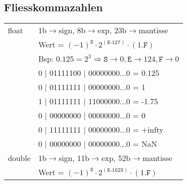 \subsection{Fliesskommazahlen}
\begin{center}
	\begin{tabular}{ ll } 
		float&1b$\rightarrow$sign, 8b$\rightarrow$exp, 23b$\rightarrow$mantisse\\
		&Wert = $(-1)^{\texttt{S}} \cdot 2^{(\texttt{E-127})} \cdot (1.\texttt{F})$\\
		&Bsp: $0.125 = 2^{3} \Rightarrow \texttt{S} \rightarrow 0, \texttt{E} \rightarrow 124, \texttt{F} \rightarrow 0$\\
		\hline
		 & 0 | 01111100 | 00000000...0 = 0.125\\
		 & 0 | 01111111 | 00000000...0 = 1\\
		 & 1 | 01111111 | 11000000...0 = -1.75\\
		 & 0 | 00000000 | 00000000...0 = 0\\
		 & 0 | 11111111 | 00000000...0 = +infty\\
		 & 0 | 00000000 | 00000000...0 = NaN\\
		\hline
		double& 1b$\rightarrow$sign, 11b$\rightarrow$exp, 52b$\rightarrow$mantisse\\
		& Wert = $(-1)^{\texttt{S}} \cdot 2^{(\texttt{E-1023})} \cdot (1.\texttt{F})$\\
	\end{tabular}
\end{center}















